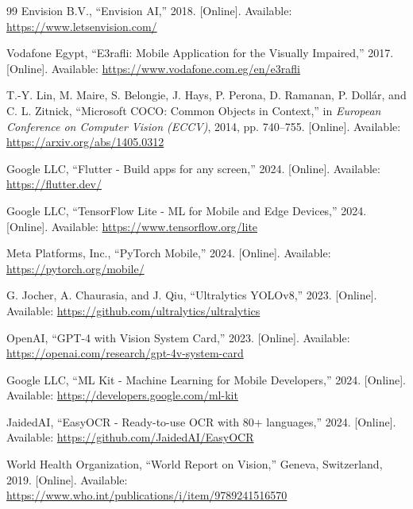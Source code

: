 \documentclass[a4paper]{report}
\begin{document}
\begin{thebibliography}{99}
Envision B.V., ``Envision AI,'' 2018. [Online]. Available: \url{https://www.letsenvision.com/}

Vodafone Egypt, ``E3rafli: Mobile Application for the Visually Impaired,'' 2017. [Online]. Available: \url{https://www.vodafone.com.eg/en/e3rafli}

T.-Y. Lin, M. Maire, S. Belongie, J. Hays, P. Perona, D. Ramanan, P. Dollár, and C. L. Zitnick, ``Microsoft COCO: Common Objects in Context,'' in \textit{European Conference on Computer Vision (ECCV)}, 2014, pp. 740--755. [Online]. Available: \url{https://arxiv.org/abs/1405.0312}

Google LLC, ``Flutter - Build apps for any screen,'' 2024. [Online]. Available: \url{https://flutter.dev/}

Google LLC, ``TensorFlow Lite - ML for Mobile and Edge Devices,'' 2024. [Online]. Available: \url{https://www.tensorflow.org/lite}

Meta Platforms, Inc., ``PyTorch Mobile,'' 2024. [Online]. Available: \url{https://pytorch.org/mobile/}

G. Jocher, A. Chaurasia, and J. Qiu, ``Ultralytics YOLOv8,'' 2023. [Online]. Available: \url{https://github.com/ultralytics/ultralytics}

OpenAI, ``GPT-4 with Vision System Card,'' 2023. [Online]. Available: \url{https://openai.com/research/gpt-4v-system-card}

Google LLC, ``ML Kit - Machine Learning for Mobile Developers,'' 2024. [Online]. Available: \url{https://developers.google.com/ml-kit}

JaidedAI, ``EasyOCR - Ready-to-use OCR with 80+ languages,'' 2024. [Online]. Available: \url{https://github.com/JaidedAI/EasyOCR}

World Health Organization, ``World Report on Vision,'' Geneva, Switzerland, 2019. [Online]. Available: \url{https://www.who.int/publications/i/item/9789241516570}

\end{thebibliography}
\end{document}
